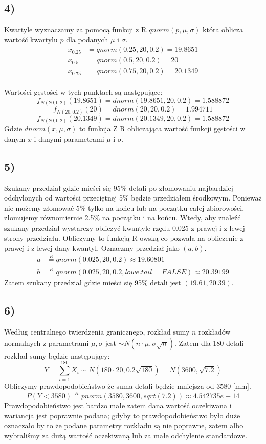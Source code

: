 \documentclass{article}
\begin{document}
{\subsection{4)}
Kwartyle wyznaczamy za pomocą funkcji z R $qnorm(p,\mu,\sigma)$ która oblicza wartość kwartylu $p$ dla podanych $\mu$ i $\sigma$.
\begin{align*}
x_{0.25} & = qnorm(0.25,20,0.2) = 19.8651 \\
x_{0.5} & = qnorm(0.5,20,0.2) = 20 \\
x_{0.75} & = qnorm(0.75,20,0.2) = 20.1349
\end{align*}
\\
Wartości gęstości w tych punktach są następujące:
$$f_{N(20,0.2)}(19.8651) = dnorm(19.8651,20,0.2) = 1.588872$$
$$f_{N(20,0.2)}(20) = dnorm(20,20,0.2) = 1.994711$$
$$f_{N(20,0.2)}(20.1349) = dnorm(20.1349,20,0.2) = 1.588872$$
Gdzie $dnorm(x,\mu,\sigma)$ to funkcja Z R obliczająca wartość funkcji gęstości w danym $x$ i danymi parametrami $\mu$ i $\sigma$.

\subsection{5)}
Szukany przedział gdzie mieści się 95\% detali po złomowaniu najbardziej odchylonych od wartości przeciętnej 5\% będzie przedziałem środkowym. Ponieważ nie możemy złomować 5\% tylko na końcu lub na początku całej zbiorowości, złomujemy równomiernie 2.5\% na początku i na końcu. Wtedy, aby znaleźć szukany przedział wystarczy obliczyć kwantyle rzędu 0.025 z prawej i z lewej strony przedziału. Obliczymy to funkcją R-owską co pozwala na obliczenie z prawej i z lewej dany kwantyl. Oznaczmy przedział jako $(a,b)$.
\begin{align*}
a & \overset{R}{=} qnorm(0.025, 20, 0.2) \approx 19.60801 \\
b & \overset{R}{=} qnorm(0.025, 20, 0.2, lowe.tail = FALSE) \approx 20.39199
\end{align*}
Zatem szukany przedział gdzie mieści się 95\% detali jest $(19.61, 20.39)$.

\subsection{6)}
Według centralnego twierdzenia granicznego, rozkład sumy $n$ rozkładów normalnych z parametrami $\mu,\sigma$ jest $\sim N(n\cdot \mu, \sigma\sqrt{n})$.
Zatem dla 180 detali rozkład sumy będzie następujący:
\[ Y = \sum_{i=1}^{180} X_i \sim N(180\cdot20, 0.2\sqrt{180}) = N(3600, \sqrt{7.2}) \]
Obliczymy prawdopodobieństwo że suma detali będzie mniejsza od 3580 [mm].
\[ P(Y<3580) \overset{R}{=} pnorm(3580, 3600, sqrt(7.2)) \approx 4.542735e-14 \]
Prawdopodobieństwo jest bardzo małe zatem dana wartość oczekiwana i wariancja jest poprawnie podana; gdyby to prawdopodobieństwo było duże oznaczało by to że podane parametry rozkładu są nie poprawne, zatem albo wybraliśmy za dużą wartość oczekiwaną lub za małe odchylenie standardowe.

}
\end{document}
